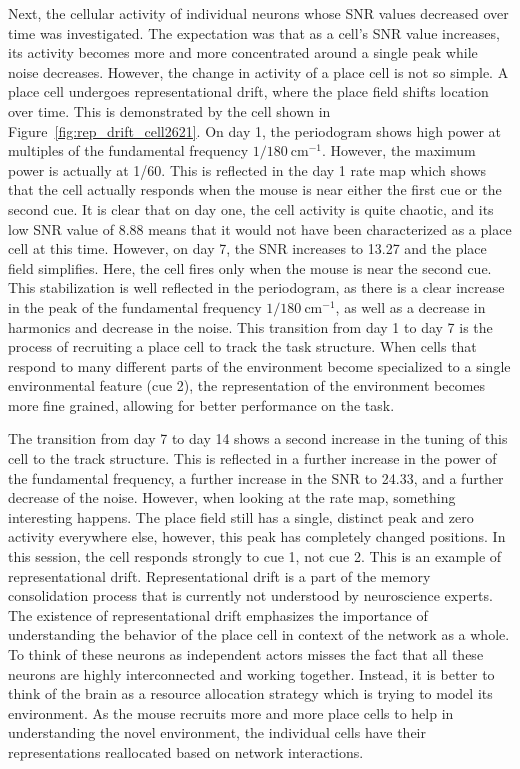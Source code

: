 \documentclass[preprint]{aastex701}
\begin{document}
Next, the cellular activity of individual neurons whose SNR values decreased over time was investigated. The expectation was that as a cell's SNR value increases, its activity becomes more and more concentrated around a single peak while noise decreases. However, the change in activity of a place cell is not so simple. A place cell undergoes representational drift, where the place field shifts location over time. \citep{ziv2013longterm} This is demonstrated by the cell shown in Figure~\ref{fig:rep_drift_cell2621}. On day 1, the periodogram shows high power at multiples of the fundamental frequency \(1/180~\mathrm{cm}^{-1}\). However, the maximum power is actually at 1/60. This is reflected in the day 1 rate map which shows that the cell actually responds when the mouse is near either the first cue or the second cue. It is clear that on day one, the cell activity is quite chaotic, and its low SNR value of 8.88 means that it would not have been characterized as a place cell at this time. However, on day 7, the SNR increases to 13.27 and the place field simplifies. Here, the cell fires only when the mouse is near the second cue. This stabilization is well reflected in the periodogram, as there is a clear increase in the peak of the fundamental frequency \(1/180~\mathrm{cm}^{-1}\), as well as a decrease in harmonics and decrease in the noise. This transition from day 1 to day 7 is the process of recruiting a place cell to track the task structure. When cells that respond to many different parts of the environment become specialized to a single environmental feature (cue 2), the representation of the environment becomes more fine grained, allowing for better performance on the task. 

The transition from day 7 to day 14 shows a second increase in the tuning of this cell to the track structure. This is reflected in a further increase in the power of the fundamental frequency, a further increase in the SNR to 24.33, and a further decrease of the noise. However, when looking at the rate map, something interesting happens. The place field still has a single, distinct peak and zero activity everywhere else, however, this peak has completely changed positions. In this session, the cell responds strongly to cue 1, not cue 2. This is an example of representational drift. Representational drift is a part of the memory consolidation process that is currently not understood by neuroscience experts. The existence of representational drift emphasizes the importance of understanding the behavior of the place cell in context of the network as a whole. To think of these neurons as independent actors misses the fact that all these neurons are highly interconnected and working together. Instead, it is better to think of the brain as a resource allocation strategy which is trying to model its environment. As the mouse recruits more and more place cells to help in understanding the novel environment, the individual cells have their representations reallocated based on network interactions.     
\end{document}
